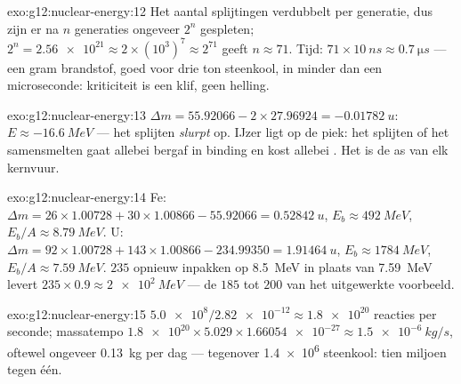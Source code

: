 \begin{solution}{exo:g12:nuclear-energy:12}
Het aantal splijtingen verdubbelt per generatie, dus zijn er na $n$ generaties
ongeveer $2^n$ gespleten; $2^{n} = \num{2.56e21} \approx 2 \times (10^{3})^{7}
\approx 2^{71}$ geeft $n \approx 71$. Tijd: $71 \times \qty{10}{ns}
\approx \qty{0.7}{\micro s}$ --- een gram brandstof, goed voor drie ton
steenkool, in minder dan een microseconde: kriticiteit is een klif, geen
helling.
\end{solution}

\begin{solution}{exo:g12:nuclear-energy:13}
$\Delta m = 55.92066 - 2 \times 27.96924 = \qty{-0.01782}{u}$:
$E \approx \qty{-16.6}{MeV}$ --- het splijten \emph{slurpt}  op. IJzer
ligt op de piek: het splijten of het samensmelten gaat allebei bergaf in
binding en kost allebei . Het is de as van elk kernvuur.
\end{solution}

\begin{solution}{exo:g12:nuclear-energy:14}
Fe: $\Delta m = 26 \times 1.00728 + 30 \times 1.00866 - 55.92066 =
\qty{0.52842}{u}$, $E_b \approx \qty{492}{MeV}$, $E_b/A \approx
\qty{8.79}{MeV}$. U: $\Delta m = 92 \times 1.00728 + 143 \times
1.00866 - 234.99350 = \qty{1.91464}{u}$, $E_b \approx \qty{1784}{MeV}$,
$E_b/A \approx \qty{7.59}{MeV}$. $235$  opnieuw inpakken op
\qty{8.5}{MeV} in plaats van \qty{7.59}{MeV} levert $235 \times 0.9
\approx \qty{2e2}{MeV}$ --- de $185$ tot $200$ van het uitgewerkte voorbeeld.
\end{solution}

\begin{solution}{exo:g12:nuclear-energy:15}
$\num{5.0e8}/\num{2.82e-12} \approx \num{1.8e20}$ reacties per seconde;
massatempo $\num{1.8e20} \times 5.029 \times \num{1.66054e-27}
\approx \qty{1.5e-6}{kg/s}$, oftewel ongeveer \qty{0.13}{kg} per dag ---
tegenover \num{1.4e6}  steenkool: tien miljoen tegen één.
\end{solution}

